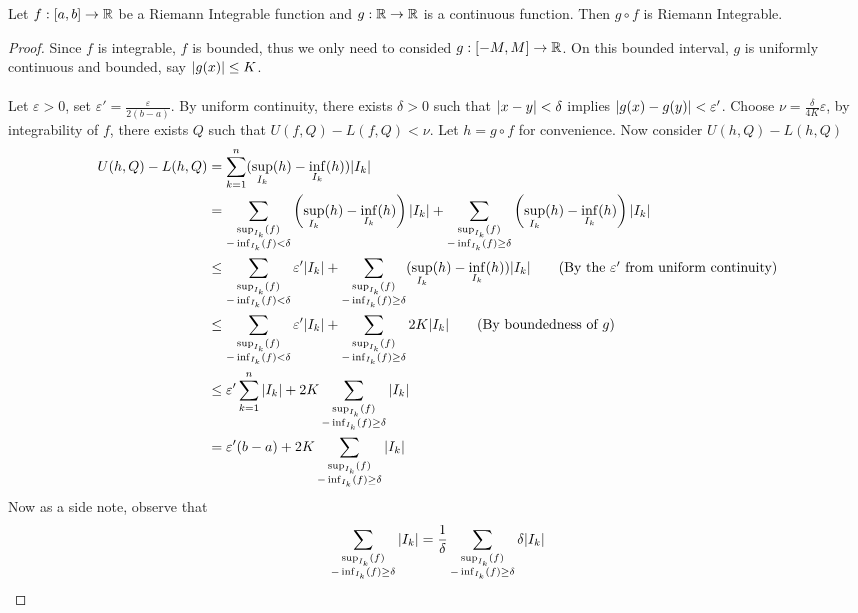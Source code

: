 \documentclass[a4paper]{article}
\begin{document}
\begin{thm}{}{} Let $f:[a,b]\to\mathbb{R}$ be a Riemann Integrable function and $g:\mathbb{R}\to\mathbb{R}$ is a continuous function. Then $g\circ f$ is Riemann Integrable. \tcbline
\begin{proof} Since $f$ is integrable, $f$ is bounded, thus we only need to consided $g:[-M,M]\to\mathbb{R}$. On this bounded interval, $g$ is uniformly continuous and bounded, say $\abs{g(x)}\leq K$. \\~\\
Let $\varepsilon>0$, set $\varepsilon'=\frac{\varepsilon}{2(b-a)}$. By uniform continuity, there exists $\delta>0$ such that $\abs{x-y}<\delta$ implies $\abs{g(x)-g(y)}<\varepsilon'$. Choose $\nu=\frac{\delta}{4K}\varepsilon$, by integrability of $f$, there exists $Q$ such that $U(f,Q)-L(f,Q)<\nu$. Let $h=g\circ f$ for convenience. Now consider $U(h,Q)-L(h,Q)$
\begin{align*}
U(h,Q)-L(h,Q)&=\sum_{k=1}^n(\sup_{I_k}(h)-\inf_{I_k}(h))\abs{I_k}\\
&=\sum_{\substack{\sup_{I_k}(f)\\-\inf_{I_k}(f)<\delta}}\left(\sup_{I_k}(h)-\inf_{I_k}(h)\right)\abs{I_k}+\sum_{\substack{\sup_{I_k}(f)\\-\inf_{I_k}(f)\geq\delta}}\left(\sup_{I_k}(h)-\inf_{I_k}(h)\right)\abs{I_k}\\
&\leq\sum_{\substack{\sup_{I_k}(f)\\-\inf_{I_k}(f)<\delta}}\varepsilon'\abs{I_k}+\sum_{\substack{\sup_{I_k}(f)\\-\inf_{I_k}(f)\geq\delta}}(\sup_{I_k}(h)-\inf_{I_k}(h))\abs{I_k}\tag{By the $\varepsilon'$ from uniform continuity}\\
&\leq\sum_{\substack{\sup_{I_k}(f)\\-\inf_{I_k}(f)<\delta}}\varepsilon'\abs{I_k}+\sum_{\substack{\sup_{I_k}(f)\\-\inf_{I_k}(f)\geq\delta}}2K\abs{I_k}\tag{By boundedness of $g$}\\
&\leq\varepsilon'\sum_{k=1}^n\abs{I_k}+2K\sum_{\substack{\sup_{I_k}(f)\\-\inf_{I_k}(f)\geq\delta}}\abs{I_k}\\
&=\varepsilon'(b-a)+2K\sum_{\substack{\sup_{I_k}(f)\\-\inf_{I_k}(f)\geq\delta}}\abs{I_k}
\end{align*}
Now as a side note, observe that
\begin{align*}
\sum_{\substack{\sup_{I_k}(f)\\-\inf_{I_k}(f)\geq\delta}}\abs{I_k}&=\frac{1}{\delta}\sum_{\substack{\sup_{I_k}(f)\\-\inf_{I_k}(f)\geq\delta}}\delta\abs{I_k}\\

\end{align*}
\end{proof}
\end{thm}
\end{document}
